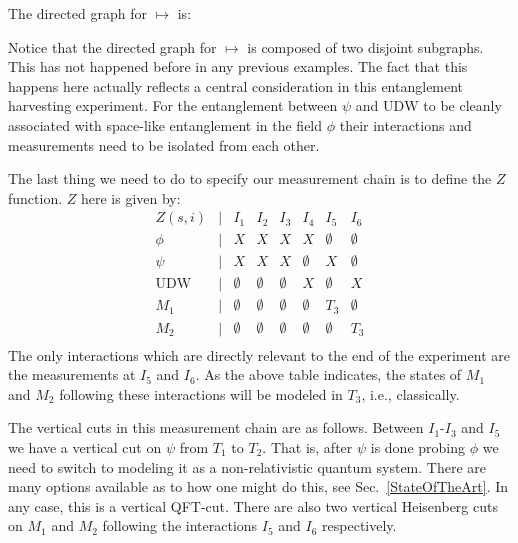 \documentclass[12pt,prd,superscriptaddress,floatfix,amsmath,amssymb,amsfonts,nofootinbib]{revtex4-2}
\begin{document}
The directed graph for $\mapsto$ is:
\begin{center}
\end{center}
Notice that the directed graph for $\mapsto$ is composed of two disjoint subgraphs. This has not happened before in any previous examples. The fact that this happens here actually reflects a central consideration in this entanglement harvesting experiment. For the entanglement between $\psi$ and $\text{UDW}$ to be cleanly associated with space-like entanglement in the field $\phi$ their interactions and measurements need to be isolated from each other.

The last thing we need to do to specify our measurement chain is to define the $Z$ function. $Z$ here is given by:
\[\begin{array}{cccccccc}
Z(s,i) & \vert & I_1 & I_2 & I_3 & I_4 & I_5 & I_6\\
\phi & \vert & X & X & X & X & \emptyset & \emptyset\\
\psi & \vert & X & X & X & \emptyset & X & \emptyset\\
\text{UDW} & \vert & \emptyset & \emptyset & \emptyset & X & \emptyset & X\\
M_1 & \vert & \emptyset & \emptyset & \emptyset & \emptyset & T_3 & \emptyset\\
M_2 & \vert & \emptyset & \emptyset & \emptyset & \emptyset & \emptyset & T_3\\
\end{array}\]
The only interactions which are directly relevant to the end of the experiment are the measurements at $I_5$ and $I_6$. As the above table indicates, the states of $M_1$ and $M_2$ following these interactions will be modeled in $T_3$, i.e., classically.

The vertical cuts in this measurement chain are as follows. Between $I_1$-$I_3$ and $I_5$ we have a vertical cut on $\psi$ from $T_1$ to $T_2$. That is, after $\psi$ is done probing $\phi$ we need to switch to modeling it as a non-relativistic quantum system. There are many options available as to how one might do this, see Sec.~\ref{StateOfTheArt}. In any case, this is a vertical QFT-cut. There are also two vertical Heisenberg cuts on $M_1$ and $M_2$ following the interactions $I_5$ and $I_6$ respectively.  
\end{document}
